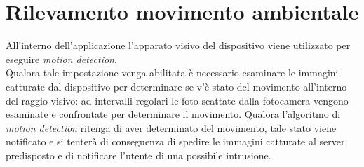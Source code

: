 \section{Rilevamento movimento ambientale}
All'interno dell'applicazione l'apparato visivo del dispositivo viene utilizzato per eseguire \textit{motion detection}.\\
Qualora tale impostazione venga abilitata è necessario esaminare le immagini catturate dal dispositivo per determinare se v'è stato del movimento all'interno del raggio visivo: ad intervalli regolari le foto scattate dalla fotocamera vengono esaminate e confrontate per determinare il movimento. Qualora l'algoritmo di \textit{motion detection} ritenga di aver determinato del movimento, tale stato viene notificato e si tenterà di conseguenza di spedire le immagini catturate al server predisposto e di notificare l'utente di una possibile intrusione.\\

